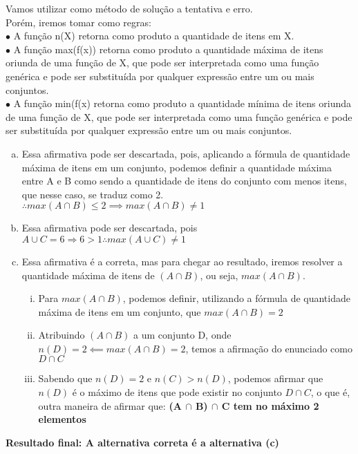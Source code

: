 \begin{solution}{}{}
    Vamos utilizar como método de solução a tentativa e erro. \\
    Porém, iremos tomar como regras: \\
    $\bullet$ A função n(X) retorna como produto a quantidade de itens em X. \\ 
    $\bullet$ A função max(f(x)) retorna como produto a quantidade máxima de itens oriunda de uma função de X, que pode ser interpretada como uma função genérica e pode ser substituída por qualquer expressão entre um ou mais conjuntos.  \\
    $\bullet$ A função min(f(x) retorna como produto a quantidade mínima de itens oriunda de uma função de X, que pode ser interpretada como uma função genérica e pode ser substituída por qualquer expressão entre um ou mais conjuntos. \\
    \begin{enumerate}[(a)]
        \item Essa afirmativa pode ser descartada, pois, aplicando a fórmula de quantidade máxima de itens em um conjunto,
        podemos definir a quantidade máxima entre A e B como sendo a quantidade de itens do conjunto com menos itens, que nesse caso, se traduz como 2. \\
        $\therefore max(A\cap B) \leq 2 \implies max(A\cap B) \ne 1$
        \item Essa afirmativa pode ser descartada, pois $A\cup C = 6 \Rightarrow 6 > 1 \therefore max(A\cup C) \ne 1$
        \item Essa afirmativa é a correta, mas para chegar ao resultado, iremos resolver a quantidade máxima de itens de $(A\cap B)$, ou seja, $max(A\cap B)$. \\
            \begin{enumerate}[(i)]
              \item Para $max(A\cap B)$, podemos definir, utilizando a fórmula de quantidade máxima de itens em um conjunto, que $max(A\cap B) = 2$
              \item Atribuindo $(A\cap B)$ a um conjunto D, onde $n(D)=2 \impliedby max(A\cap B) =2$, temos a afirmação do enunciado como $D\cap C$
              \item Sabendo que $n(D)=2$ e $n(C) > n(D)$, podemos afirmar que $n(D)$ é o máximo de itens que pode existir no conjunto $D\cap C$, o que é, outra maneira de afirmar que: \textbf{(A $\cap$ B) $\cap$ C tem no máximo 2 elementos}
            \end{enumerate}
    \end{enumerate}

    \textbf{Resultado final: A alternativa correta é a alternativa (c)}
\end{solution}

